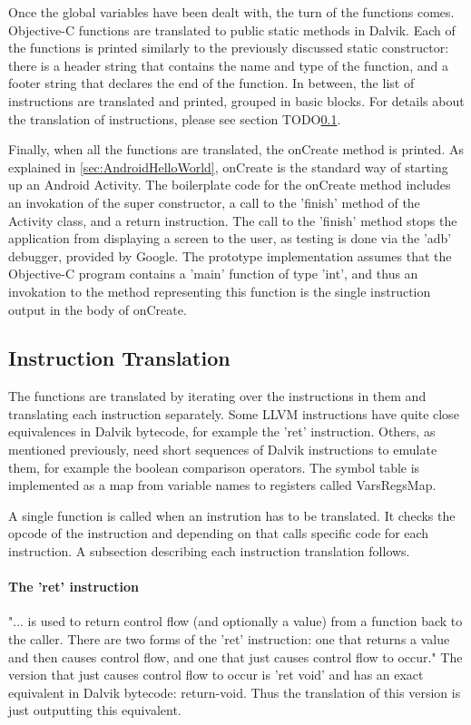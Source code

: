 \documentclass[parskip]{cs4rep}
\begin{document}
Once the global variables have been dealt with, the turn of the functions comes. Objective-C functions are translated to public static methods in Dalvik. Each of the functions is printed similarly to the previously discussed static constructor: there is a header string that contains the name and type of the function, and a footer string that declares the end of the function. In between, the list of instructions are translated and printed, grouped in basic blocks. For details about the translation of instructions, please see section TODO\ref{sec:instructionTranslation}.

Finally, when all the functions are translated, the onCreate method is printed. As explained in \ref{sec:AndroidHelloWorld}, onCreate is the standard way of starting up an Android Activity. The boilerplate code for the onCreate method includes an invokation of the super constructor, a call to the 'finish' method of the Activity class, and a return instruction. The call to the 'finish' method stops the application from displaying a screen to the user, as testing is done via the 'adb' debugger, provided by Google. The prototype implementation assumes that the Objective-C program contains a 'main' function of type 'int', and thus an invokation to the method representing this function is the single instruction output in the body of onCreate.

\subsection{Instruction Translation} \label{sec:instructionTranslation}

The functions are translated by iterating over the instructions in them and translating each instruction separately. Some LLVM instructions have quite close equivalences in Dalvik bytecode, for example the 'ret' instruction. Others, as mentioned previously, need short sequences of Dalvik instructions to emulate them, for example the boolean comparison operators. The symbol table is implemented as a map from variable names to registers called VarsRegsMap. 

A single function is called when an instrution has to be translated. It checks the opcode of the instruction and depending on that calls specific code for each instruction. A subsection describing each instruction translation follows.

\paragraph{The 'ret' instruction} "... is used to return control flow (and optionally a value) from a function back to the caller. There are two forms of the 'ret' instruction: one that returns a value and then causes control flow, and one that just causes control flow to occur."\cite{P11} The version that just causes control flow to occur is 'ret void' and has an exact equivalent in Dalvik bytecode: return-void. Thus the translation of this version is just outputting this equivalent.
\end{document}
